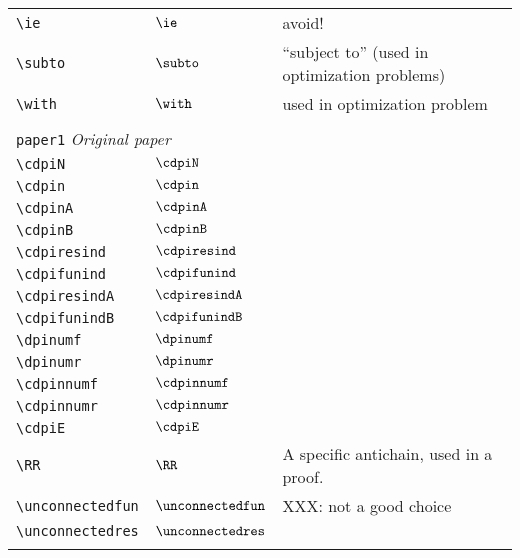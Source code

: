 \begin{longtable}{lll}
 {\color[rgb]{0.5,0.5,0.5}\texttt{\textbackslash ie}} & $\ie$ &  avoid!\\ 
 {\color[rgb]{0.5,0.5,0.5}\texttt{\textbackslash subto}} & $\subto$ &  ``subject to'' (used in optimization problems)\\ 
 {\color[rgb]{0.5,0.5,0.5}\texttt{\textbackslash with}} & $\with$ &  used in optimization problem\\ 
  &  & \\ 
 \multicolumn{3}{l}{{\color[rgb]{0.5,0.5,0.5}\texttt{paper1}} \emph{Original paper}}\\ 
 \hline
\hline
{\color[rgb]{0.5,0.5,0.5}\texttt{\textbackslash cdpiN}} & $\cdpiN$ & \\ 
 {\color[rgb]{0.5,0.5,0.5}\texttt{\textbackslash cdpin}} & $\cdpin$ & \\ 
 {\color[rgb]{0.5,0.5,0.5}\texttt{\textbackslash cdpinA}} & $\cdpinA$ & \\ 
 {\color[rgb]{0.5,0.5,0.5}\texttt{\textbackslash cdpinB}} & $\cdpinB$ & \\ 
 {\color[rgb]{0.5,0.5,0.5}\texttt{\textbackslash cdpiresind}} & $\cdpiresind$ & \\ 
 {\color[rgb]{0.5,0.5,0.5}\texttt{\textbackslash cdpifunind}} & $\cdpifunind$ & \\ 
 {\color[rgb]{0.5,0.5,0.5}\texttt{\textbackslash cdpiresindA}} & $\cdpiresindA$ & \\ 
 {\color[rgb]{0.5,0.5,0.5}\texttt{\textbackslash cdpifunindB}} & $\cdpifunindB$ & \\ 
 {\color[rgb]{0.5,0.5,0.5}\texttt{\textbackslash dpinumf}} & $\dpinumf$ & \\ 
 {\color[rgb]{0.5,0.5,0.5}\texttt{\textbackslash dpinumr}} & $\dpinumr$ & \\ 
 {\color[rgb]{0.5,0.5,0.5}\texttt{\textbackslash cdpinnumf}} & $\cdpinnumf$ & \\ 
 {\color[rgb]{0.5,0.5,0.5}\texttt{\textbackslash cdpinnumr}} & $\cdpinnumr$ & \\ 
 {\color[rgb]{0.5,0.5,0.5}\texttt{\textbackslash cdpiE}} & $\cdpiE$ & \\ 
 {\color[rgb]{0.5,0.5,0.5}\texttt{\textbackslash RR}} & $\RR$ &  A specific antichain, used in a proof.\\ 
 {\color[rgb]{0.5,0.5,0.5}\texttt{\textbackslash unconnectedfun}} & $\unconnectedfun$ &  XXX: not a good choice\\ 
 {\color[rgb]{0.5,0.5,0.5}\texttt{\textbackslash unconnectedres}} & $\unconnectedres$ & \\ 
  &  & \\ 

\end{longtable}
